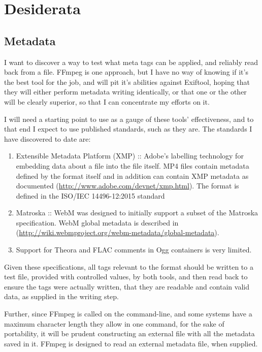 \documentclass{article}
\begin{document}
\section{Desiderata}
\label{sec:org8f32310}

\subsection{Metadata}
\label{sec:orgb4eca3b}

I want to discover a way to test what meta tags can be applied, and reliably
read back from a file. FFmpeg is one approach, but I have no way of knowing if
it's the best tool for the job, and will pit it's abilities against Exiftool,
hoping that they will either perform metadata writing identically, or that one
or the other will be clearly superior, so that I can concentrate my efforts on
it.

I will need a starting point to use as a gauge of these tools' effectiveness,
and to that end I expect to use published standards, such as they are. The
standards I have discovered to date are:

\begin{enumerate}
\item Extensible Metadata Platform (XMP) :: Adobe's labelling technology for
embedding data about a file into the file itself. MP4 files contain
metadata defined by the format itself and in addition can contain XMP
metadata as documented (\href{http://www.adobe.com/devnet/xmp.html}{\url{http://www.adobe.com/devnet/xmp.html}}). The format
is defined in the ISO/IEC 14496-12:2015 standard
\item Matroska :: WebM was designed to initially support a subset of the Matroska
specification. WebM global metadata is described in
(\href{http://wiki.webmproject.org/webm-metadata/global-metadata}{\url{http://wiki.webmproject.org/webm-metadata/global-metadata}}).
\item Support for Theora and FLAC comments in Ogg containers is very limited.
\end{enumerate}

Given these specifications, all tags relevant to the format should be written to
a test file,  provided with controlled values, by both tools, and then read back
to ensure the tags were actually written, that they are readable and contain
valid data, as supplied in the writing step.

Further, since FFmpeg is called on the command-line, and some systems have a
maximum character length they allow in one command, for the sake of portability,
it will be prudent constructing an external file with all the metadata saved in
it. FFmpeg is designed to read an external metadata file, when supplied.
\end{document}
